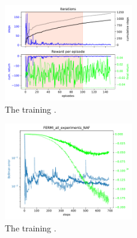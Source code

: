 \documentclass[
 reprint,
 amsmath,amssymb,amsfonts,clevref,
 aps,
prstab,
]{revtex4-2}
\begin{document}
\begin{figure}[!h]
  \centering
  \includegraphics*[width=0.5\textwidth]{Figures/FERMI_all_experiments_NAF_episodes.pdf}
  \caption{The training .}
  \label{fig:comparsion_per}
\end{figure}
\begin{figure}[!h]
  \centering
  \includegraphics*[width=0.5\textwidth]{Figures/FERMI_all_experiments_NAF_convergence.pdf}
  \caption{The training .}
  \label{fig:comparsion_per}
\end{figure}

\end{document}
